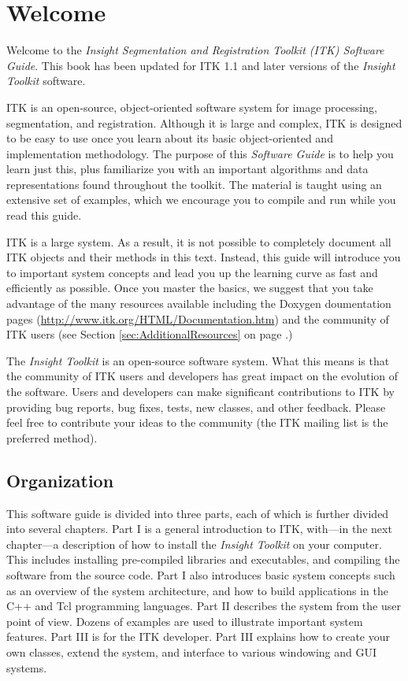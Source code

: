 \chapter{Welcome}
\label{chapter:Introduction}

Welcome to the \emph{Insight Segmentation and Registration Toolkit (ITK)
Software Guide}. This book has been updated for ITK 1.1 and later versions of
the \emph{Insight Toolkit} software.

ITK is an open-source, object-oriented software system for image processing,
segmentation, and registration.  Although it is large and complex, ITK is
designed to be easy to use once you learn about its basic object-oriented and
implementation methodology. The purpose of this \emph{Software Guide} is
to help you learn just this, plus familiarize you with an important
algorithms and data representations found throughout the toolkit. The material
is taught using an extensive set of examples, which we encourage you to compile
and run while you read this guide.

ITK is a large system. As a result, it is not possible to completely document
all ITK objects and their methods in this text. Instead, this guide will
introduce you to important system concepts and lead you up the learning curve
as fast and efficiently as possible. Once you master the basics, we suggest
that you take advantage of the many resources available including the Doxygen
doumentation pages (\url{http://www.itk.org/HTML/Documentation.htm}) and
the community of ITK users (see Section \ref{sec:AdditionalResources} on page 
\pageref{sec:AdditionalResources}.)

The \emph{Insight Toolkit} is an open-source software system. What this means
is that the community of ITK users and developers has great impact on the
evolution of the software. Users and developers can make significant
contributions to ITK by providing bug reports, bug fixes, tests, new classes,
and other feedback. Please feel free to contribute your ideas to the
community (the ITK mailing list is the preferred method).

\section{Organization}
\label{sec:Organization}

This software guide is divided into three parts, each of which is further
divided into several chapters. Part I is a general introduction to ITK,
with---in the next chapter---a description of how to install the \emph{Insight
Toolkit} on your computer. This includes installing pre-compiled libraries and
executables, and compiling the software from the source code. Part I also
introduces basic system concepts such as an overview of the system
architecture, and how to build applications in the C++ and Tcl programming
languages. Part II describes the system from the user point of view. Dozens
of examples are used to illustrate important system features. Part III is for
the ITK developer. Part III explains how to create your own classes, extend
the system, and interface to various windowing and GUI systems.

